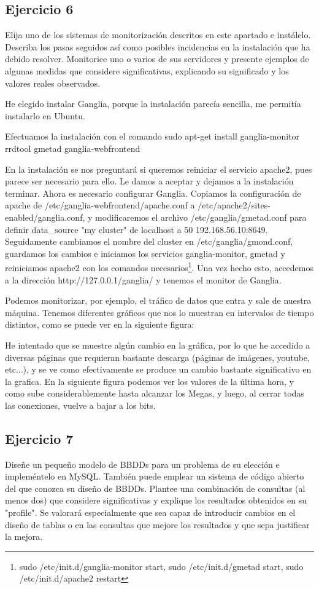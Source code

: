 \documentclass[a4paper, 11pt]{article} %
\begin{document}
\subsection{Ejercicio 6}
Elija uno de los sistemas de monitorización descritos en este apartado e instálelo. Describa los pasas seguidos así como posibles incidencias en la instalación que ha debido resolver. Monitorice uno o varios de sus servidores y presente ejemplos de algunas medidas que considere significativas, explicando su significado y los valores reales observados.

He elegido instalar Ganglia, porque la instalación parecía sencilla, me permitía instalarlo en Ubuntu. 

Efectuamos la instalación con el comando sudo apt-get install ganglia-monitor rrdtool gmetad ganglia-webfrontend

En la instalación se nos preguntará si queremos reiniciar el servicio apache2, pues parece ser necesario para ello. Le damos a aceptar y dejamos a la instalación terminar. Ahora es necesario configurar Ganglia. Copiamos la configuración de apache de  /etc/ganglia-webfrontend/apache.conf a /etc/apache2/sites-enabled/ganglia.conf, y modificaremos el archivo  /etc/ganglia/gmetad.conf para definir data\_source "my cluster" de localhost a 50 192.168.56.10:8649. Seguidamente cambiamos el nombre del cluster en /etc/ganglia/gmond.conf, guardamos los cambios e iniciamos los servicios ganglia-monitor, gmetad y reiniciamos apache2 con los comandos necesarios\footnote{sudo /etc/init.d/ganglia-monitor start, sudo /etc/init.d/gmetad start, sudo /etc/init.d/apache2 restart}. Una vez hecho esto, accedemos a la dirección http://127.0.0.1/ganglia/ y tenemos el monitor de Ganglia. 

Podemos monitorizar, por ejemplo, el tráfico de datos que entra y sale de nuestra máquina. Tenemos diferentes gráficos que nos lo muestran en intervalos de tiempo distintos, como se puede ver en la siguiente figura: 

He intentado que se muestre algún cambio en la gráfica, por lo que he accedido a diversas páginas que requieran bastante descarga (páginas de imágenes, youtube, etc...), y se ve como efectivamente se produce un cambio bastante significativo en la grafica. En la siguiente figura podemos ver los valores de la última hora, y como sube considerablemente hasta alcanzar los Megas, y luego, al cerrar todas las conexiones, vuelve a bajar a los bits. 


\subsection{Ejercicio 7}
Diseñe un pequeño modelo de BBDDs para un problema de su elección e impleméntelo en MySQL. También puede emplear un sistema de código abierto del que conozca su diseño de BBDDs. Plantee una combinación de consultas (al menos dos) que considere significativas y explique los resultados obtenidos en su "profile". Se valorará especialmente que sea capaz de introducir cambios en el diseño de tablas o en las consultas que mejore los resultados y que sepa justificar la mejora. 
\end{document}
